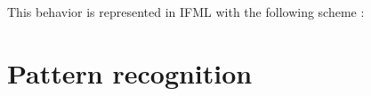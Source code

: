 This behavior is represented in IFML with the following scheme :
















\section{Pattern recognition}



